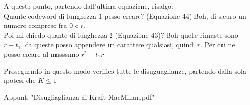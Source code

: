 \begin{dimostrazione}
A questo punto, partendo dall'ultima equazione, risalgo.\\
Quante codeword di lunghezza 1 posso creare? (Equazione 44) Boh, di sicuro un numero compreso fra 0 e $r$.\\
Poi mi chiedo quante di lunghezza 2 (Equazione 43)? Boh quelle rimaste sono $r-t_1$, da queste posso appendere un carattere qualsiasi, quindi $r$.
Per cui ne posso creare al masssimo $r^2-t_1r$

Proseguendo in questo modo verifico tutte le disuguaglianze, partendo dalla sola ipotesi che $K \leq 1$

\medskip

Appunti "Disugliaglianza di Kraft MacMillan.pdf"
\end{dimostrazione}



